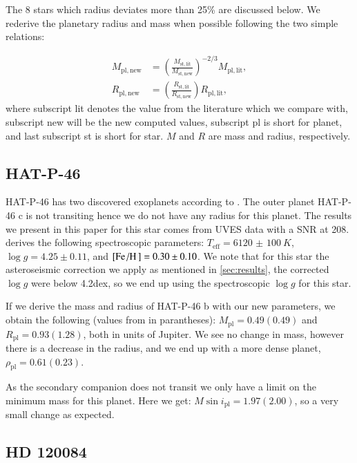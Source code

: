 \documentclass{aa}
\begin{document}
The 8 stars which radius deviates more than 25\% are discussed below. We
rederive the planetary radius and mass when possible following the two simple
relations:

\begin{align}
    M_\mathrm{pl,new} &= \left(\frac{M_\mathrm{st,lit}}{M_\mathrm{st,new}}\right)^{-2/3} M_\mathrm{pl,lit},  \\
    R_\mathrm{pl,new} &= \left(\frac{R_\mathrm{st,lit}}{R_\mathrm{st,new}}\right) R_\mathrm{pl,lit},
\end{align}
where subscript lit denotes the value from the literature which we compare with,
subscript new will be the new computed values, subscript pl is short for planet,
and last subscript st is short for star. $M$ and $R$ are mass and radius,
respectively.

\subsection{HAT-P-46}
\label{sub:HAT-P-46}
HAT-P-46 has two discovered exoplanets according to \citet{Hartmann2014}. The
outer planet HAT-P-46 c is not transiting hence we do not have any radius for
this planet. The results we present in this paper for this star comes from UVES
data with a SNR at 208. \citet{Hartmann2014} derives the following spectroscopic
parameters: $T_\mathrm{eff}=\SI{6120(100)}{K}$, $\log g=4.25\pm0.11$, and
$[\ion{Fe}/\ion{H}]=0.30\pm0.10$. We note that for this star the asteroseismic
correction we apply as mentioned in \ref{sec:results}, the corrected $\log g$
were below 4.2dex, so we end up using the spectroscopic $\log g$ for this star.

If we derive the mass and radius of HAT-P-46 b with our new parameters, we
obtain the following (values from \citet{Hartmann2014} in parantheses):
$M_\mathrm{pl} = 0.49(0.49)$ and $R_\mathrm{pl} = 0.93(1.28)$, both in units
of Jupiter. We see no change in mass, however there is a decrease in the radius,
and we end up with a more dense planet, $\rho_\mathrm{pl} = 0.61(0.23)$.

As the secondary companion does not transit we only have a limit on the minimum
mass for this planet. Here we get: $M\sin i_\mathrm{pl} = 1.97(2.00)$, so a very
small change as expected.


\subsection{HD 120084}
\label{sub:HD_120084}
\end{document}
